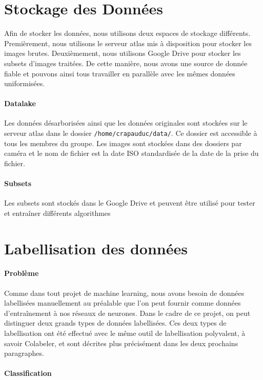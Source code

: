 \section{Stockage des Données}
Afin de stocker les données, nous utilisons deux espaces de stockage différents. Premièrement, nous utilisons le serveur atlas mis à disposition pour stocker les images brutes. Deuxièmement, nous utilisons Google Drive pour stocker les subsets d'images traitées. De cette manière, nous avons une source de donnée fiable et pouvons ainsi tous travailler en parallèle avec les mêmes données uniformisées.

\paragraph*{Datalake}

Les données désarborisées ainsi que les données originales sont stockées sur le serveur atlas dans le dossier \texttt{/home/crapauduc/data/}. Ce dossier est accessible à tous les membres du groupe. Les images sont stockées dans des dossiers par caméra et le nom de fichier est la date ISO standardisée de la date de la prise du fichier.

\paragraph{Subsets}

Les subsets sont stockés dans le Google Drive et peuvent être utilisé pour tester et entraîner différents algorithmes

\section{Labellisation des données}

\paragraph{Problème}

Comme dans tout projet de machine learning, nous avons besoin de données labellisées manuellement au préalable que l'on peut fournir comme données d'entraînement à nos réseaux de neurones. Dans le cadre de ce projet, on peut distinguer deux grands types de données labellisées. Ces deux types de labellisation ont été effectué avec le même outil de labellisation polyvalent, à savoir Colabeler, et sont décrites plus précisément dans les deux prochains paragraphes.

\paragraph{Classification}

